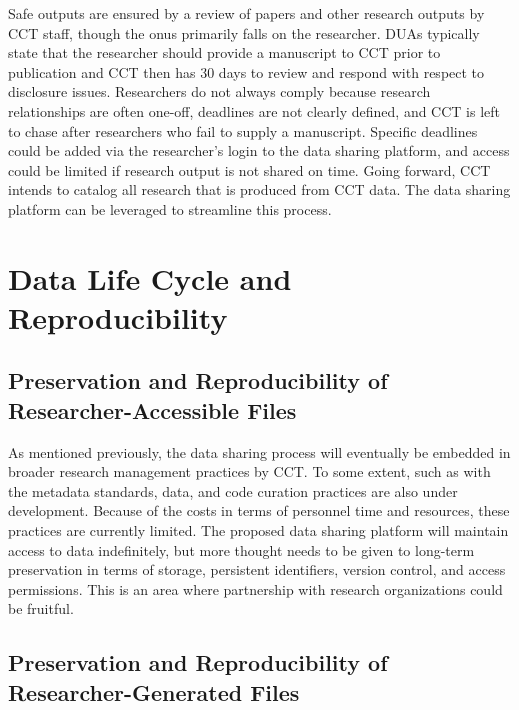 Safe outputs are ensured by a review of papers and other research outputs by CCT staff, though the onus primarily falls on the researcher. DUAs typically state that the researcher should provide a manuscript to CCT prior to publication and CCT then has 30 days to review and respond with respect to disclosure issues. Researchers do not always comply because research relationships are often one-off, deadlines are not clearly defined, and CCT is left to chase after researchers who fail to supply a manuscript. Specific deadlines could be added via the researcher's login to the data sharing platform, and access could be limited if research output is not shared on time. Going forward, CCT intends to catalog all research that is produced from CCT data. The data sharing platform can be leveraged to streamline this process.

\hypertarget{data-life-cycle-and-reproducibility-1}{%
\section{Data Life Cycle and Reproducibility}\label{data-life-cycle-and-reproducibility-1}}

\hypertarget{preservation-and-reproducibility-of-researcher-accessible-files-4}{%
\subsection{Preservation and Reproducibility of Researcher-Accessible Files}\label{preservation-and-reproducibility-of-researcher-accessible-files-4}}

As mentioned previously, the data sharing process will eventually be embedded in broader research management practices by CCT. To some extent, such as with the metadata standards, data, and code curation practices are also under development. Because of the costs in terms of personnel time and resources, these practices are currently limited. The proposed data sharing platform will maintain access to data indefinitely, but more thought needs to be given to long-term preservation in terms of storage, persistent identifiers, version control, and access permissions. This is an area where partnership with research organizations could be fruitful.

\hypertarget{preservation-and-reproducibility-of-researcher-generated-files-3}{%
\subsection{Preservation and Reproducibility of Researcher-Generated Files}\label{preservation-and-reproducibility-of-researcher-generated-files-3}}

